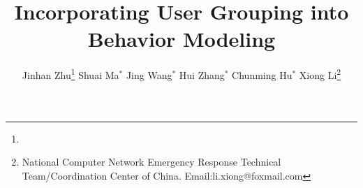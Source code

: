 \documentclass[twoside,leqno,twocolumn]{article}
\begin{document}
\begin{CJK*}{GBK}{song}
\begin{comment}
\date{}	
\end{comment}

\title{\Large Incorporating User Grouping into \Retg{} Behavior Modeling}
\author{Jinhan Zhu\thanks{\beihang}
\hspace{2ex} Shuai Ma$^{*}$
\hspace{2ex} Jing Wang$^{*}$
\hspace{2ex} Hui Zhang$^{*}$
\hspace{2ex} Chunming Hu$^{*}$
\hspace{2ex} Xiong Li\thanks{National Computer Network Emergency Response Technical Team/Coordination Center of China. Email:li.xiong@foxmail.com}}


\date{}	

\maketitle



















%



\balance



\end{CJK*}
\end{document}
